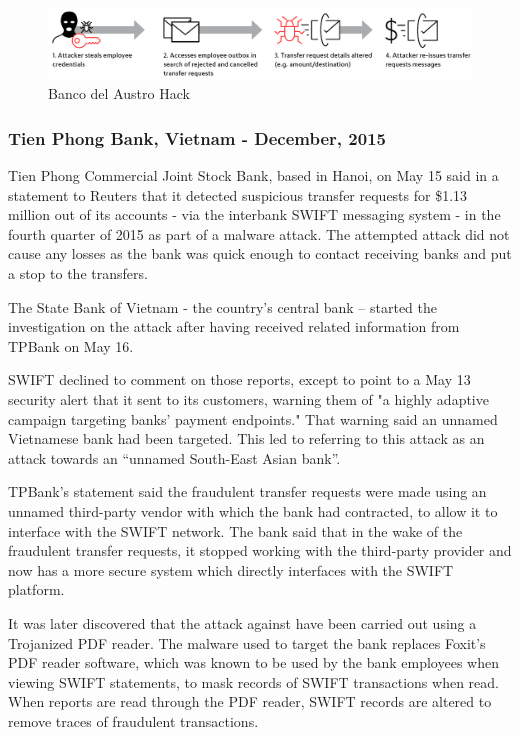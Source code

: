\documentclass[12pt]{article}
\begin{document}
        \begin{figure}[H]
        \centering
        \includegraphics[width=\textwidth]{figures/austro.png}
        \caption{Banco del Austro Hack}
        \label{fig:AustroHacks}
        \end{figure}
        
    \subsubsection{Tien Phong Bank, Vietnam - December, 2015}
    
        Tien Phong Commercial Joint Stock Bank, based in Hanoi, on May 15 said in a statement to Reuters that it detected suspicious transfer requests for \$1.13 million out of its accounts - via the interbank SWIFT messaging system - in the fourth quarter of 2015 as part of a malware attack. The attempted attack did not cause any losses as the bank was quick enough to contact receiving banks and put a stop to the transfers.
        
        The State Bank of Vietnam - the country's central bank – started the investigation on the attack after having received related information from TPBank on May 16.
        
        SWIFT declined to comment on those reports, except to point to a May 13 security alert that it sent to its customers, warning them of "a highly adaptive campaign targeting banks' payment endpoints." That warning said an unnamed Vietnamese bank had been targeted. This led to referring to this attack as an attack towards an “unnamed South-East Asian bank”.\cite{SWIFTWarnsBanks}
        
        TPBank's statement said the fraudulent transfer requests were made using an unnamed third-party vendor with which the bank had contracted, to allow it to interface with the SWIFT network. The bank said that in the wake of the fraudulent transfer requests, it stopped working with the third-party provider and now has a more secure system which directly interfaces with the SWIFT platform.
        
        It was later discovered that the attack against have been carried out using a Trojanized PDF reader. The malware used to target the bank replaces Foxit's PDF reader software,  which was known to be used by the bank employees when viewing SWIFT statements, to mask records of SWIFT transactions when read. When reports are read through the PDF reader, SWIFT records are altered to remove traces of fraudulent transactions.
        
\end{document}
